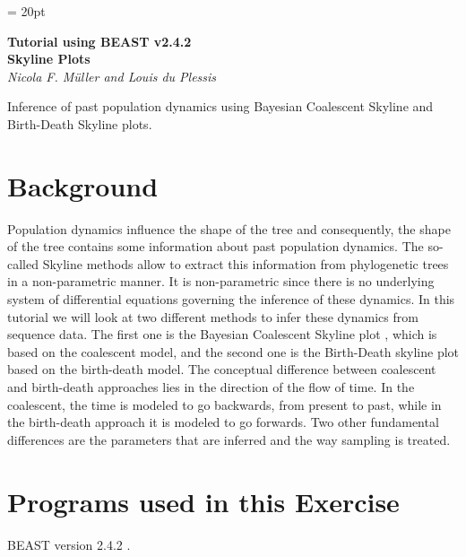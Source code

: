 \documentclass[11pt]{article}
\begin{document}
\renewcommand{\headrulewidth}{0.5pt}
\headsep = 20pt
\lhead{ }

\thispagestyle{plain}

\begin{center}
\textbf{\LARGE Tutorial using BEAST v2.4.2}\\\vspace{2mm}
\textbf{\textcolor{mycol}{\Large Skyline Plots}}\\
\vspace{4mm}
{\Large {\em Nicola F. M\"uller and Louis du Plessis}}
\end{center}


Inference of past population dynamics using Bayesian Coalescent Skyline and Birth-Death Skyline plots.

\bigskip
\section{Background}

Population dynamics influence the shape of the tree and consequently, the shape of the tree contains some information about past population dynamics. The so-called Skyline methods allow to extract this information from phylogenetic trees in a non-parametric manner. It is non-parametric since there is no underlying system of differential equations governing the inference of these dynamics. In this tutorial we will look at two different methods to infer these dynamics from sequence data. The first one is the Bayesian Coalescent Skyline plot \citep{Drummond2005}, which is based on the coalescent model, and the second one is the Birth-Death skyline \citep{Stadler2013} plot based on the birth-death model. The conceptual difference between coalescent and birth-death approaches lies in the direction of the flow of time. In the coalescent, the time is modeled to go backwards, from present to past, while in the birth-death approach it is modeled to go forwards. Two other fundamental differences are the parameters that are inferred and the way sampling is treated. 


\bigskip
\section{Programs used in this Exercise}\label{programsSec}


BEAST version 2.4.2 \citep{Bouckaert2014}. 
\end{document}
